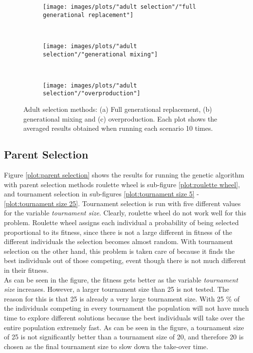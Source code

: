 \begin{figure}[h!]
    \centering
    \begin{subfigure}[b]{0.31\textwidth}
        \texttt{[image: images/plots/"adult selection"/"full generational replacement"]}
        \caption{}
        \hfill
        \label{plot:full generational replacement}
    \end{subfigure}
    ~
    \begin{subfigure}[b]{0.31\textwidth}
        \texttt{[image: images/plots/"adult selection"/"generational mixing"]}
        \caption{}
        \hfill
        \label{plot:generational mixing}
    \end{subfigure}
    ~
    \begin{subfigure}[b]{0.31\textwidth}
        \texttt{[image: images/plots/"adult selection"/"overproduction"]}
        \caption{}
        \hfill
        \label{plot:overproduction}
    \end{subfigure}
    \caption{Adult selection methods: (a) Full generational replacement, (b) generational mixing and (c) overproduction. Each plot shows the averaged results obtained when running each scenario 10 times.}
    \label{plot:adult selection methods}
\end{figure}


\subsection{Parent Selection}
Figure \ref{plot:parent selection} shows the results for running the genetic algorithm with parent selection methods roulette wheel is sub-figure \ref{plot:roulette wheel}, and tournament selection in sub-figures \ref{plot:tournament size 5} - \ref{plot:tournament size 25}. Tournament selection is run with five different values for the variable \textit{tournament size}. Clearly, roulette wheel do not work well for this problem. Roulette wheel assigns each individual a probability of being selected proportional to its fitness, since there is not a large different in fitness of the different individuals the selection becomes almost random. With tournament selection on the other hand, this problem is taken care of because it finds the best individuals out of those competing, event though there is not much different in their fitness.\\


\noindent As can be seen in the figure, the fitness gets better as the variable \textit{tournament size} increases. However, a larger tournament size than 25 is not tested. The reason for this is that 25 is already a very large tournament size. With 25 \% of the individuals competing in every tournament the population will not have much time to explore different solutions because the best individuals will take over the entire population extremely fast. As can be seen in the figure, a tournament size of 25 is not significantly better than a tournament size of 20, and therefore 20 is chosen as the final tournament size to slow down the take-over time. \\


